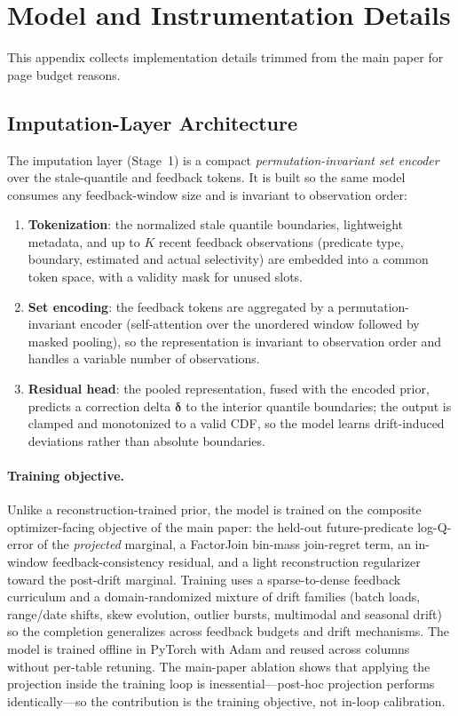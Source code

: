 \section{Model and Instrumentation Details}
\label{sec:system-details-app}

This appendix collects implementation details trimmed from the main paper for
page budget reasons.

\subsection{Imputation-Layer Architecture}

The imputation layer (Stage~1) is a compact \emph{permutation-invariant set encoder} over
the stale-quantile and feedback tokens. It is built so the same model consumes any
feedback-window size and is invariant to observation order:

\begin{enumerate}
  \item \textbf{Tokenization}: the normalized stale quantile boundaries, lightweight
        metadata, and up to $K$ recent feedback observations (predicate type, boundary,
        estimated and actual selectivity) are embedded into a common token space, with a
        validity mask for unused slots.
  \item \textbf{Set encoding}: the feedback tokens are aggregated by a permutation-invariant
        encoder (self-attention over the unordered window followed by masked pooling), so the
        representation is invariant to observation order and handles a variable number of
        observations.
  \item \textbf{Residual head}: the pooled representation, fused with the encoded prior,
        predicts a correction delta $\boldsymbol{\delta}$ to the interior quantile
        boundaries; the output is clamped and monotonized to a valid CDF, so the model learns
        drift-induced deviations rather than absolute boundaries.
\end{enumerate}

\paragraph{Training objective.}
Unlike a reconstruction-trained prior, the model is trained on the composite
optimizer-facing objective of the main paper: the held-out future-predicate log-Q-error of
the \emph{projected} marginal, a FactorJoin bin-mass join-regret term, an in-window
feedback-consistency residual, and a light reconstruction regularizer toward the post-drift
marginal. Training uses a sparse-to-dense feedback curriculum and a domain-randomized mixture
of drift families (batch loads, range/date shifts, skew evolution, outlier bursts, multimodal
and seasonal drift) so the completion generalizes across feedback budgets and drift
mechanisms. The model is trained offline in PyTorch with Adam and reused across columns
without per-table retuning. The main-paper ablation shows that applying the projection inside
the training loop is inessential---post-hoc projection performs identically---so the
contribution is the training objective, not in-loop calibration.

